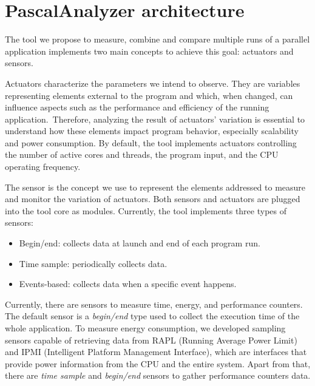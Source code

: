 %

\section{PascalAnalyzer architecture} \label{sec:pascal_architecture}
The tool we propose to measure, combine and compare multiple runs of a parallel application implements two main concepts to achieve this goal: actuators and sensors.

Actuators characterize the parameters we intend to observe. They are variables representing elements external to the program and which, when changed, can influence aspects such as the performance and efficiency of the running application.~Therefore, analyzing the result of actuators' variation is essential to understand how these elements impact program behavior, especially scalability and power consumption. By default, the tool implements actuators controlling the number of active cores and threads, the program input, and the CPU operating frequency.

The sensor is the concept we use to represent the elements addressed to measure and monitor the variation of actuators. Both sensors and actuators are plugged into the tool core as modules. Currently, the tool implements three types of sensors:

\begin{itemize}
	\item Begin/end: collects data at launch and end of each program run.
	\item Time sample: periodically collects data.
	\item Events-based: collects data when a specific event happens.
\end{itemize}

Currently, there are sensors to measure time, energy, and performance counters. The default sensor is a \textit{begin/end} type used to collect the execution time of the whole application. To measure energy consumption, we developed sampling sensors capable of retrieving data from RAPL (Running Average Power Limit) and IPMI (Intelligent Platform Management Interface), which are interfaces that provide power information from the CPU
and the entire system. Apart from that, there are \textit{time sample} and \textit{begin/end} sensors to gather performance counters data.

